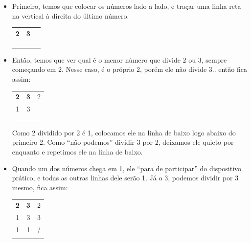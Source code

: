 \begin{itemize}
    \item Primeiro, temos que colocar os números lado a lado, e traçar uma linha reta na vertical à direita do último número.

    \begin{table}[H]
    \centering
    \begin{tabular}{cc|c}
        \textbf{2} & \textbf{3} & \\
         &  & \\
         &  & \\
         &  & \\
    \end{tabular}
    \end{table}

    \item Então, temos que ver qual é o menor número que divide 2 ou 3, sempre começando em 2. Nesse caso, é o próprio 2, porém ele não divide 3.. então fica assim:

    \begin{table}[H]
    \centering
    \begin{tabular}{cc|c}
        \textbf{2} & \textbf{3} & 2\\
        1 & 3 & \\
         &  & \\
         &  & \\
    \end{tabular}
    \end{table}

    Como 2 dividido por 2 é 1, colocamos ele na linha de baixo logo abaixo do primeiro 2. Como ``não podemos'' dividir 3 por 2, deixamos ele quieto por enquanto e repetimos ele na linha de baixo.

    \item Quando um dos números chega em 1, ele ``para de participar'' do dispositivo prático, e todas as outras linhas dele serão 1. Já o 3, podemos dividir por 3 mesmo, fica assim:

    \begin{table}[H]
    \centering
    \begin{tabular}{cc|c}
        \textbf{2} & \textbf{3} & 2\\
        1 & 3 & 3\\
        1 & 1 & /\\
         &  & \\
    \end{tabular}
    \end{table}


\end{itemize}
